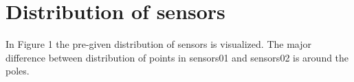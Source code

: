 \documentclass[a4paper, 12pt]{article}
\begin{document}
\section{Distribution of sensors}
In Figure 1 the pre-given distribution of sensors is visualized. The major difference between distribution of points in sensors01 and sensors02 is around the poles.
\begin{figure}[H]
        \centering
\end{figure}
\end{document}
